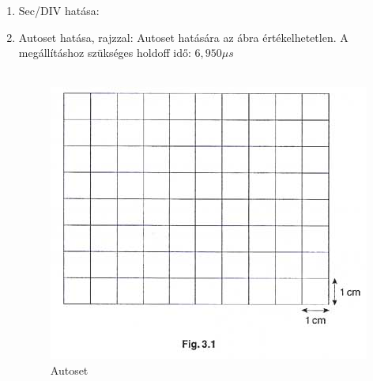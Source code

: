 \documentclass[10pt,a4paper]{article}
\begin{document}
\begin{enumerate}
\begin{figure}[hbtp]
					\end{figure}\\\\
			\item Sec/DIV hatása: $$$$ $$$$
			\item Autoset hatása, rajzzal:
			Autoset hatására az ábra értékelhetetlen. A megállításhoz szükséges holdoff idő: $6,950 \mu s$ \\\\\begin{figure}[hbtp]
			\centering
			\includegraphics[scale=0.5]{teljes/osc.jpg}
			\caption{Autoset}
			\end{figure}
					
		\end{enumerate}
\end{document}

